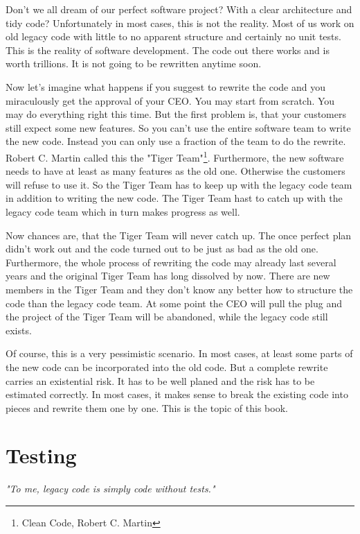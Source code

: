 Don't we all dream of our perfect software project? With a clear architecture and tidy code? Unfortunately in most cases, this is not the reality. Most of us work on old legacy code with little to no apparent structure and certainly no unit tests. This is the reality of software development. The code out there works and is worth trillions. It is not going to be rewritten anytime soon.

Now let's imagine what happens if you suggest to rewrite the code and you miraculously get the approval of your CEO. You may start from scratch. You may do everything right this time. But the first problem is, that your customers still expect some new features. So you can't use the entire software team to write the new code. Instead you can only use a fraction of the team to do the rewrite. Robert C. Martin called this the "Tiger Team"\footnote{Clean Code, Robert C. Martin}. Furthermore, the new software needs to have at least as many features as the old one. Otherwise the customers will refuse to use it. So the Tiger Team has to keep up with the legacy code team in addition to writing the new code. The Tiger Team hast to catch up with the legacy code team which in turn makes progress as well.

Now chances are, that the Tiger Team will never catch up. The once perfect plan didn't work out and the code turned out to be just as bad as the old one. Furthermore, the whole process of rewriting the code may already last several years and the original Tiger Team has long dissolved by now. There are new members in the Tiger Team and they don't know any better how to structure the code than the legacy code team. At some point the CEO will pull the plug and the project of the Tiger Team will be abandoned, while the legacy code still exists.

Of course, this is a very pessimistic scenario. In most cases, at least some parts of the new code can be incorporated into the old code. But a complete rewrite carries an existential risk. It has to be well planed and the risk has to be estimated correctly. In most cases, it makes sense to break the existing code into pieces and rewrite them one by one. This is the topic of this book.

\chapter{Testing}

\textsl{"To me, legacy code is simply code without tests."}

